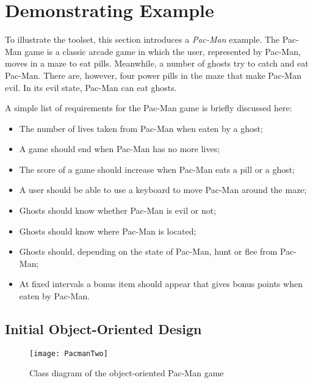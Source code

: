 \newpage
\section{Demonstrating Example}
\label{sec:demonstratingexample}

To illustrate the \Compose* toolset, this section introduces a \emph{Pac-Man} example.
The Pac-Man game is a classic arcade game in which the user, represented by Pac-Man, moves in a maze to eat pills.
Meanwhile, a number of ghosts try to catch and eat Pac-Man.
There are, however, four power pills in the maze that make Pac-Man evil. In its evil state, Pac-Man can eat ghosts.

A simple list of requirements for the Pac-Man game is briefly discussed here:
\begin{itemize}[noitemsep]
  \item The number of lives taken from Pac-Man when eaten by a ghost;
  \item A game should end when Pac-Man has no more lives;
  \item The score of a game should increase when Pac-Man eats a pill or a ghost;
  \item A user should be able to use a keyboard to move Pac-Man around the maze;
  \item Ghosts should know whether Pac-Man is evil or not;
  \item Ghosts should know where Pac-Man is located;
  \item Ghosts should, depending on the state of Pac-Man, hunt or flee from Pac-Man;
  \item At fixed intervals a bonus item should appear that gives bonus points when eaten by Pac-Man.
\end{itemize}

\subsection{Initial Object-Oriented Design}

\begin{figure}[p]
  \centering
  \texttt{[image: PacmanTwo]}
  \caption{Class diagram of the object-oriented Pac-Man game}
  \label{fig:pacman2_class_diagram}
\end{figure}

